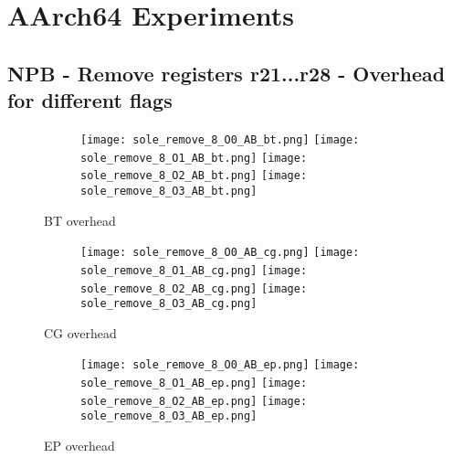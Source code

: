 \documentclass[11pt]{article}
\begin{document}
    \section*{AArch64 Experiments}

%
%

    \subsection*{NPB - Remove registers r21...r28 - Overhead for different flags}

    \begin{figure}[ht]
        \begin{subfigure}{\linewidth}
            \texttt{[image: sole\_remove\_8\_O0\_AB\_bt.png]}\hfill
            \texttt{[image: sole\_remove\_8\_O1\_AB\_bt.png]}\hfill
            \texttt{[image: sole\_remove\_8\_O2\_AB\_bt.png]}\hfill
            \texttt{[image: sole\_remove\_8\_O3\_AB\_bt.png]}\hfill
        \end{subfigure}\par\medskip
        \caption{BT overhead}
        \label{fig:sole_figs_1}
    \end{figure}

    \begin{figure}[ht]
        \begin{subfigure}{\linewidth}
            \texttt{[image: sole\_remove\_8\_O0\_AB\_cg.png]}\hfill
            \texttt{[image: sole\_remove\_8\_O1\_AB\_cg.png]}\hfill
            \texttt{[image: sole\_remove\_8\_O2\_AB\_cg.png]}\hfill
            \texttt{[image: sole\_remove\_8\_O3\_AB\_cg.png]}\hfill
        \end{subfigure}\par\medskip
        \caption{CG overhead}
        \label{fig:sole_figs_2}
    \end{figure}
\begin{figure}[ht]
        \begin{subfigure}{\linewidth}
            \texttt{[image: sole\_remove\_8\_O0\_AB\_ep.png]}\hfill
            \texttt{[image: sole\_remove\_8\_O1\_AB\_ep.png]}\hfill
            \texttt{[image: sole\_remove\_8\_O2\_AB\_ep.png]}\hfill
            \texttt{[image: sole\_remove\_8\_O3\_AB\_ep.png]}\hfill
        \end{subfigure}\par\medskip
        \caption{EP overhead}
        \label{fig:sole_figs_3}
    \end{figure}
\end{document}
